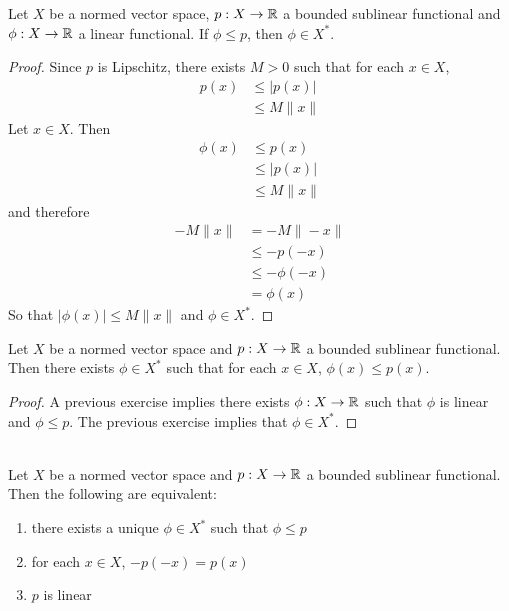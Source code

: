 \documentclass{book}
\begin{document}
	\begin{ex} 
	Let $X$ be a normed vector space, $p:X \rightarrow \mathbb{R}$ a bounded sublinear functional and $\phi:X \rightarrow \mathbb{R}$ a linear functional. If $\phi \leq p$, then $\phi \in X^*$. 
	\end{ex}
	
	\begin{proof}
	Since $p$ is Lipschitz, there exists $M >0$ such that for each $x \in X$, 
	\begin{align*}
	p(x) 
	&\leq |p(x)| \\
	&\leq M \|x\|
	\end{align*}
	Let $x \in X$. Then 
	\begin{align*}
	\phi(x) 
	&\leq p(x) \\
	&\leq |p(x)| \\
	&\leq M \|x\| 
	\end{align*}
	and therefore  
	\begin{align*}
	- M \|x\| 
	&= -M \|-x\| \\
	& \leq -p(-x) \\
	& \leq - \phi(-x) \\
	&= \phi(x) 
	\end{align*}
	So that $|\phi(x)| \leq  M\|x\|$ and $\phi \in X^*$.
	\end{proof}
	
	\begin{ex} 
	Let $X$ be a normed vector space and $p:X \rightarrow \mathbb{R}$ a bounded sublinear functional. Then there exists $\phi \in X^*$ such that for each $x \in X$, $\phi(x) \leq p(x)$.
	\end{ex}
	
	\begin{proof}
	A previous exercise implies there exists $\phi: X \rightarrow \mathbb{R}$ such that $\phi$ is linear and $\phi \leq p$. The previous exercise implies that $\phi \in X^*$.
	\end{proof}
	
	\begin{ex}  \\
	Let $X$ be a normed vector space and $p:X \rightarrow \mathbb{R}$ a bounded sublinear functional. Then the following are equivalent:
	\begin{enumerate}
	\item there exists a unique $\phi \in X^*$ such that $\phi \leq p$
	\item for each $x \in X$, $-p(-x) = p(x)$
	\item $p$ is linear
\end{enumerate}	
	\end{ex}
	
\end{document}
